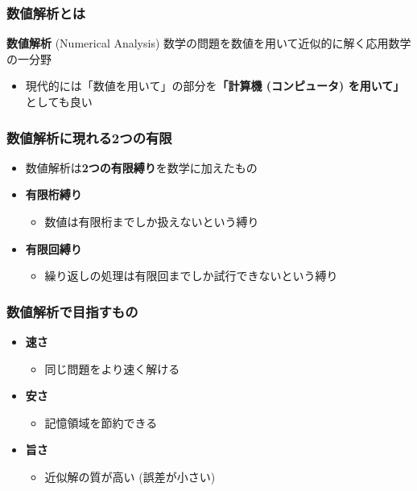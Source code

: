 \documentclass[dvipdfmx,aspectratio=169,20pt]{beamer}
\begin{document}
\begin{frame}
\frametitle{数値解析とは}
\begin{block}{{\bf 数値解析} {\small (Numerical Analysis)}}
数学の問題を数値を用いて近似的に解く応用数学の一分野
\end{block}
\begin{itemize}
    \item 現代的には「数値を用いて」の部分を{\bf 「計算機 (コンピュータ) を用いて」}としても良い
\end{itemize}
\end{frame}
\begin{frame}
\frametitle{{\large 数値解析に現れる2つの有限}}
\begin{itemize}
    \setlength{\itemsep}{0.5cm}
    \item 数値解析は{\bf 2つの有限縛り}を数学に加えたもの
    \item {\bf 有限桁縛り}
    \begin{itemize}
        \item 数値は有限桁までしか扱えないという縛り
    \end{itemize}
    \item {\bf 有限回縛り}
    \begin{itemize}
        \item 繰り返しの処理は有限回までしか試行できないという縛り
    \end{itemize}
\end{itemize}
\end{frame}
\begin{frame}
\frametitle{{\large 数値解析で目指すもの}}
\begin{itemize}
    \setlength{\itemsep}{0.5cm}
    \item {\bf 速さ}
    \begin{itemize}
        \item 同じ問題をより速く解ける
    \end{itemize}
    \item {\bf 安さ}
    \begin{itemize}
        \item 記憶領域を節約できる
    \end{itemize}
    \item {\bf 旨さ}
    \begin{itemize}
        \item 近似解の質が高い (誤差が小さい)
    \end{itemize}
\end{itemize}
\end{frame}
\end{document}
